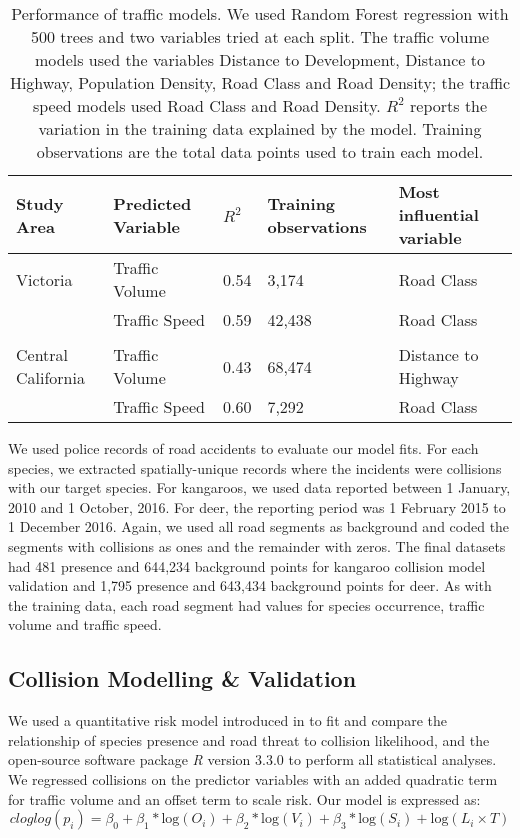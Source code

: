 \begin{table}[!h]
\caption[Performance of traffic models]{Performance of traffic models. We used Random Forest regression with 500 trees and two variables tried at each split. The traffic volume models used the variables Distance to Development, Distance to Highway, Population Density, Road Class and Road Density; the traffic speed models used Road Class and Road Density. $R^2$ reports the variation in the training data explained by the model. Training observations are the total data points used to train each model.}
\centering
\begin{tabularx}{0.9\textwidth}{lllll} \toprule
Study Area         	&Predicted Variable	& $R^2$	& Training observations		& Most influential variable \\ \midrule 
Victoria		 	& Traffic Volume	& 0.54 	& 3,174 					& Road Class \\ 
					& Traffic Speed		& 0.59	& 42,438 					& Road Class \\
&& \\ 
Central California	& Traffic Volume	& 0.43	& 68,474 					& Distance to Highway \\
			 		& Traffic Speed		& 0.60	& 7,292 					& Road Class \\
\bottomrule
\end{tabularx}
\label{cal_tmodel_perf}
\end{table}

We used police records of road accidents to evaluate our model fits.  For each species, we extracted spatially-unique records where the incidents were collisions with our target species.  For kangaroos, we used data reported between 1 January, 2010 and 1 October, 2016. For deer, the reporting period was 1 February 2015 to 1 December 2016.  Again, we used all road segments as background and coded the segments with collisions as ones and the remainder with zeros. The final datasets had 481 presence and 644,234 background points for kangaroo collision model validation and 1,795 presence and 643,434 background points for deer. As with the training data, each road segment had values for species occurrence, traffic volume and traffic speed.

\subsection{Collision Modelling \& Validation}

We used a quantitative risk model introduced in  to fit and compare the relationship of species presence and road threat to collision likelihood, and the open-source software package \textit{R} version 3.3.0 \citep{rdct16} to perform all statistical analyses. We regressed collisions on the predictor variables with an added quadratic term for traffic volume and an offset term to scale risk. Our model is expressed as:
\begin{equation} \label{eq:41}
cloglog(p_i) = \beta_0 + \beta_1*\text{log}(O_i) + \beta_2*\text{log}(V_i) + \beta_3*\text{log}(S_i) + \text{log}(L_i \times T)
\end{equation}

